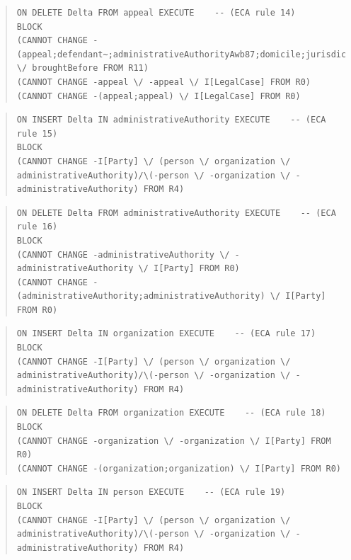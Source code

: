 \documentclass[10pt,a4paper]{report}              %
\theoremstyle{plain}\theorembodyfont{\rmfamily}\newtheorem{definition}{Definition}[section]
\theoremstyle{plain}\theorembodyfont{\rmfamily}\newtheorem{designrule}[definition]{Requirement}
\begin{document}
\begin{quote}
\begin{verbatim}
ON DELETE Delta FROM appeal EXECUTE    -- (ECA rule 14)
BLOCK
(CANNOT CHANGE -(appeal;defendant~;administrativeAuthorityAwb87;domicile;jurisdiction) \/ broughtBefore FROM R11)
(CANNOT CHANGE -appeal \/ -appeal \/ I[LegalCase] FROM R0)
(CANNOT CHANGE -(appeal;appeal) \/ I[LegalCase] FROM R0)
\end{verbatim}
\end{quote}
\begin{quote}
\begin{verbatim}
ON INSERT Delta IN administrativeAuthority EXECUTE    -- (ECA rule 15)
BLOCK
(CANNOT CHANGE -I[Party] \/ (person \/ organization \/ administrativeAuthority)/\(-person \/ -organization \/ -administrativeAuthority) FROM R4)
\end{verbatim}
\end{quote}
\begin{quote}
\begin{verbatim}
ON DELETE Delta FROM administrativeAuthority EXECUTE    -- (ECA rule 16)
BLOCK
(CANNOT CHANGE -administrativeAuthority \/ -administrativeAuthority \/ I[Party] FROM R0)
(CANNOT CHANGE -(administrativeAuthority;administrativeAuthority) \/ I[Party] FROM R0)
\end{verbatim}
\end{quote}
\begin{quote}
\begin{verbatim}
ON INSERT Delta IN organization EXECUTE    -- (ECA rule 17)
BLOCK
(CANNOT CHANGE -I[Party] \/ (person \/ organization \/ administrativeAuthority)/\(-person \/ -organization \/ -administrativeAuthority) FROM R4)
\end{verbatim}
\end{quote}
\begin{quote}
\begin{verbatim}
ON DELETE Delta FROM organization EXECUTE    -- (ECA rule 18)
BLOCK
(CANNOT CHANGE -organization \/ -organization \/ I[Party] FROM R0)
(CANNOT CHANGE -(organization;organization) \/ I[Party] FROM R0)
\end{verbatim}
\end{quote}
\begin{quote}
\begin{verbatim}
ON INSERT Delta IN person EXECUTE    -- (ECA rule 19)
BLOCK
(CANNOT CHANGE -I[Party] \/ (person \/ organization \/ administrativeAuthority)/\(-person \/ -organization \/ -administrativeAuthority) FROM R4)
\end{verbatim}
\end{quote}
\end{document}
